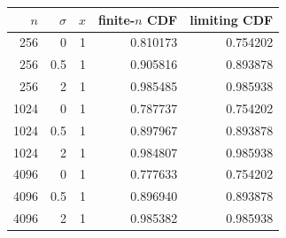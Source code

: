 \begin{tabular}{@{}rrrrr@{}}
\toprule
$n$ & $\sigma$ & $x$ & finite-$n$ CDF & limiting CDF \\
\midrule
256 & 0 & 1 & 0.810173 & 0.754202 \\
256 & 0.5 & 1 & 0.905816 & 0.893878 \\
256 & 2 & 1 & 0.985485 & 0.985938 \\
1024 & 0 & 1 & 0.787737 & 0.754202 \\
1024 & 0.5 & 1 & 0.897967 & 0.893878 \\
1024 & 2 & 1 & 0.984807 & 0.985938 \\
4096 & 0 & 1 & 0.777633 & 0.754202 \\
4096 & 0.5 & 1 & 0.896940 & 0.893878 \\
4096 & 2 & 1 & 0.985382 & 0.985938 \\
\bottomrule
\end{tabular}
